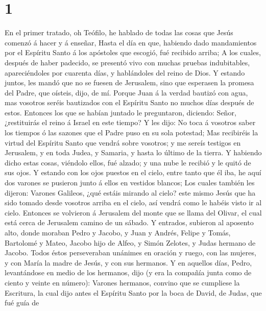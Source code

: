 \hypertarget{section}{%
\section{1}\label{section}}

 En el primer tratado, oh Teófilo, he hablado de todas las
cosas que Jesús comenzó á hacer y á enseñar,  Hasta el día
en que, habiendo dado mandamientos por el Espíritu Santo á los apóstoles
que escogió, fué recibido arriba;  A los cuales, después de
haber padecido, se presentó vivo con muchas pruebas indubitables,
apareciéndoles por cuarenta días, y hablándoles del reino de Dios.
 Y estando juntos, les mandó que no se fuesen de Jerusalem,
sino que esperasen la promesa del Padre, que oísteis, dijo, de mí.
 Porque Juan á la verdad bautizó con agua, mas vosotros
seréis bautizados con el Espíritu Santo no muchos días después de estos.
 Entonces los que se habían juntado le preguntaron,
diciendo: Señor, ¿restituirás el reino á Israel en este tiempo?
 Y les dijo: No toca á vosotros saber los tiempos ó las
sazones que el Padre puso en su sola potestad;  Mas
recibiréis la virtud del Espíritu Santo que vendrá sobre vosotros; y me
sereís testigos en Jerusalem, y en toda Judea, y Samaria, y hasta lo
último de la tierra.  Y habiendo dicho estas cosas, viéndolo
ellos, fué alzado; y una nube le recibió y le quitó de sus ojos.
 Y estando con los ojos puestos en el cielo, entre tanto
que él iba, he aquí dos varones se pusieron junto á ellos en vestidos
blancos;  Los cuales también les dijeron: Varones Galileos,
¿qué estáis mirando al cielo? este mismo Jesús que ha sido tomado desde
vosotros arriba en el cielo, así vendrá como le habéis visto ir al
cielo.  Entonces se volvieron á Jerusalem del monte que se
llama del Olivar, el cual está cerca de Jerusalem camino de un sábado.
 Y entrados, subieron al aposento alto, donde moraban Pedro
y Jacobo, y Juan y Andrés, Felipe y Tomás, Bartolomé y Mateo, Jacobo
hijo de Alfeo, y Simón Zelotes, y Judas hermano de Jacobo. 
Todos éstos perseveraban unánimes en oración y ruego, con las mujeres, y
con María la madre de Jesús, y con sus hermanos.  Y en
aquellos días, Pedro, levantándose en medio de los hermanos, dijo (y era
la compañía junta como de ciento y veinte en número): 
Varones hermanos, convino que se cumpliese la Escritura, la cual dijo
antes el Espíritu Santo por la boca de David, de Judas, que fué guía de
